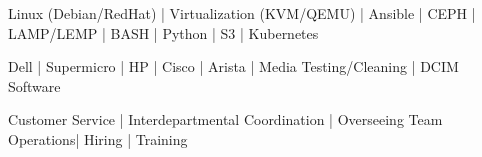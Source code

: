 
\begin{cvskills}

	\cvskill
	{}{Linux (Debian/RedHat) | Virtualization (KVM/QEMU) | Ansible | CEPH | LAMP/LEMP | BASH | Python | S3 | Kubernetes}

	\cvskill
	{}{Dell | Supermicro | HP | Cisco | Arista | Media Testing/Cleaning | DCIM Software}

	\cvskill
	{}{Customer Service | Interdepartmental Coordination | Overseeing Team Operations| Hiring | Training}

\end{cvskills}

